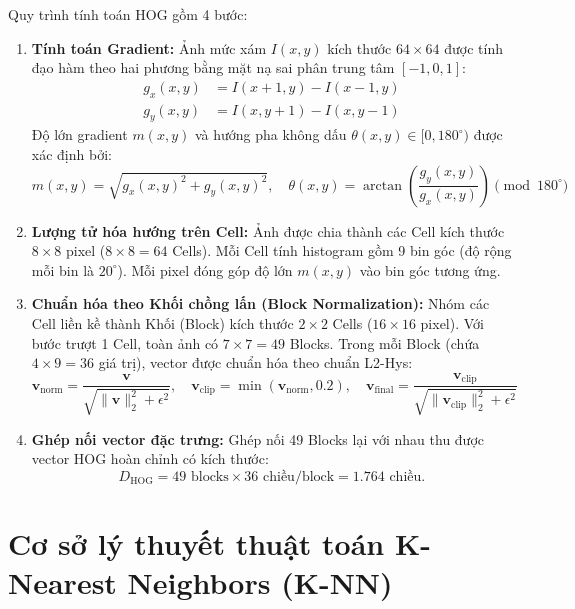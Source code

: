 \documentclass[../DoAn.tex]{subfiles}
\begin{document}
Quy trình tính toán HOG gồm 4 bước:
\begin{enumerate}
    \item \textbf{Tính toán Gradient:} Ảnh mức xám $I(x, y)$ kích thước $64 \times 64$ được tính đạo hàm theo hai phương bằng mặt nạ sai phân trung tâm $[-1, 0, 1]$:
    \begin{align}
        g_x(x, y) &= I(x + 1, y) - I(x - 1, y) \\
        g_y(x, y) &= I(x, y + 1) - I(x, y - 1)
    \end{align}
    Độ lớn gradient $m(x, y)$ và hướng pha không dấu $\theta(x, y) \in [0, 180^\circ)$ được xác định bởi:
    \begin{equation}
        m(x, y) = \sqrt{g_x(x, y)^2 + g_y(x, y)^2}, \quad \theta(x, y) = \arctan\left(\frac{g_y(x, y)}{g_x(x, y)}\right) \pmod{180^\circ}
    \end{equation}

    \item \textbf{Lượng tử hóa hướng trên Cell:} Ảnh được chia thành các Cell kích thước $8 \times 8$ pixel ($8 \times 8 = 64$ Cells). Mỗi Cell tính histogram gồm 9 bin góc (độ rộng mỗi bin là $20^\circ$). Mỗi pixel đóng góp độ lớn $m(x, y)$ vào bin góc tương ứng.

    \item \textbf{Chuẩn hóa theo Khối chồng lấn (Block Normalization):} Nhóm các Cell liền kề thành Khối (Block) kích thước $2 \times 2$ Cells ($16 \times 16$ pixel). Với bước trượt 1 Cell, toàn ảnh có $7 \times 7 = 49$ Blocks. Trong mỗi Block (chứa $4 \times 9 = 36$ giá trị), vector được chuẩn hóa theo chuẩn L2-Hys:
    \begin{equation}
        \mathbf{v}_{\text{norm}} = \frac{\mathbf{v}}{\sqrt{\|\mathbf{v}\|_2^2 + \epsilon^2}}, \quad \mathbf{v}_{\text{clip}} = \min(\mathbf{v}_{\text{norm}}, 0.2), \quad \mathbf{v}_{\text{final}} = \frac{\mathbf{v}_{\text{clip}}}{\sqrt{\|\mathbf{v}_{\text{clip}}\|_2^2 + \epsilon^2}}
    \end{equation}

    \item \textbf{Ghép nối vector đặc trưng:} Ghép nối 49 Blocks lại với nhau thu được vector HOG hoàn chỉnh có kích thước:
    \begin{equation}
        D_{\text{HOG}} = 49 \text{ blocks} \times 36 \text{ chiều/block} = 1.764 \text{ chiều.}
    \end{equation}
\end{enumerate}

\section{Cơ sở lý thuyết thuật toán K-Nearest Neighbors (K-NN)}
\end{document}
